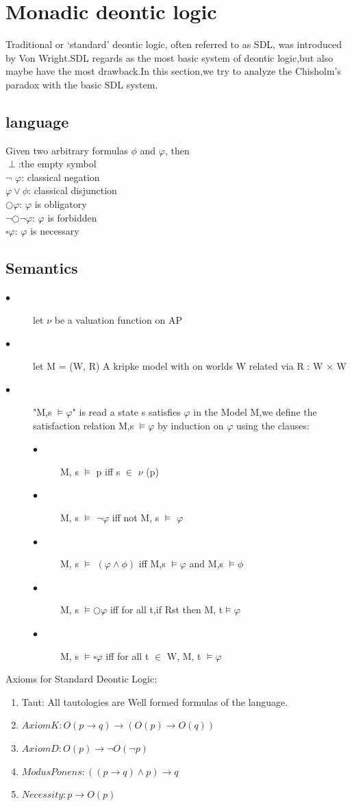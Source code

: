 \documentclass{article}
\begin{document}
\section{Monadic deontic logic}
Traditional or ‘standard’ deontic logic, often referred to as SDL, was introduced by Von Wright\cite{4}.SDL regards as the most basic system of deontic logic,but also maybe have the most drawback.In this section,we try to analyze the Chisholm’s paradox with the basic SDL system.
\subsection{language}
Given two arbitrary formulas $\phi$  and $\varphi$, then\\
$\perp$:the empty symbol\\
$\neg$ $\varphi$: classical negation\\
$\varphi \vee  \phi $: classical disjunction\\
$\bigcirc \varphi $: $\varphi$ is obligatory\\
$ \neg \bigcirc\neg\varphi$: $ \varphi$ is forbidden\\
$ \square\varphi$: $\varphi$ is necessary
\subsection{Semantics}
\begin{description}
\item[$\bullet$ ] let $\nu$ be a valuation function on AP
\item[$\bullet $]  let M = (W, R) A kripke model with on worlds W related via R : W × W
\item[$\bullet $]  "M,s $ \vDash \varphi$" is read a state s satisfies $\varphi$ in the Model M,we define the satisfaction relation M,s $ \vDash \varphi$ by induction on $\varphi$ using the clauses:
\begin{description}
\item[$\bullet$ ]M, s $ \vDash $ p iff s $\in$ $\nu$  (p)
\item[$\bullet$ ]M, s $ \vDash $ $\neg \varphi$ iff not M, s $ \vDash $ $\varphi$
\item[$\bullet$ ]M, s $ \vDash $ $(\varphi\land\phi )$ iff M,s $ \vDash \varphi$ and  M,s $ \vDash \phi$
\item[$\bullet$ ]M, s $ \vDash  \bigcirc\varphi$ iff for all t,if Rst then M, t$\vDash \varphi$
\item[$\bullet$ ]M, s $ \vDash  \square\varphi$ iff for all t $\in$ W, M, t $\vDash \varphi$
\end{description}
\end{description}
Axioms for Standard Deontic Logic:
\begin{enumerate}
\item Taut: All tautologies are Well formed formulas of the language.
\item  $Axiom K: O(p \to q) \to (O(p) \to O(q)) $
\item $ Axiom D: O(p) \to \neg O(\neg p)$
\item $Modus Ponens: ((p \to q) \land p) \to q $
\item $ Necessity: p \to O(p)$
\end{enumerate}
\end{document}
